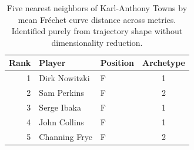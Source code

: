 \begin{table}[htbp]
  \centering\small
  \begin{tabular}{rllc}
    \toprule
    Rank & Player & Position & Archetype \\
    \midrule
    1 & Dirk Nowitzki & F & 1 \\
    2 & Sam Perkins & F & 2 \\
    3 & Serge Ibaka & F & 1 \\
    4 & John Collins & F & 1 \\
    5 & Channing Frye & F & 2 \\
    \bottomrule
  \end{tabular}
  \caption{Five nearest neighbors of Karl-Anthony Towns by mean Fr\'{e}chet curve distance across metrics. Identified purely from trajectory shape without dimensionality reduction.}
  \label{tab:Karl_Anthony_Towns_frechet_curve_neighbors}
\end{table}

